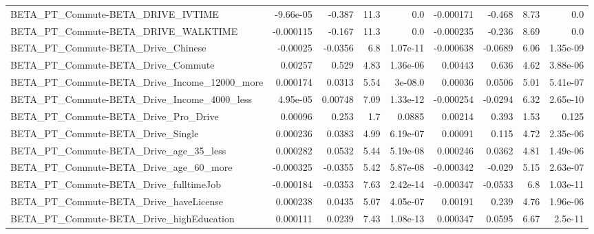 \begin{tabular}{lrrrrrrrr}
BETA\_PT\_Commute-BETA\_DRIVE\_IVTIME                  &   -9.66e-05 &       -0.387 &      11.3 &      0.0 &  -0.000171 &      -0.468 &         8.73 &           0.0 \\
BETA\_PT\_Commute-BETA\_DRIVE\_WALKTIME                &   -0.000115 &       -0.167 &      11.3 &      0.0 &  -0.000235 &      -0.236 &         8.69 &           0.0 \\
BETA\_PT\_Commute-BETA\_Drive\_Chinese                 &    -0.00025 &      -0.0356 &       6.8 & 1.07e-11 &  -0.000638 &     -0.0689 &         6.06 &      1.35e-09 \\
BETA\_PT\_Commute-BETA\_Drive\_Commute                 &     0.00257 &        0.529 &      4.83 & 1.36e-06 &    0.00443 &       0.636 &         4.62 &      3.88e-06 \\
BETA\_PT\_Commute-BETA\_Drive\_Income\_12000\_more       &    0.000174 &       0.0313 &      5.54 &  3e-08.0 &    0.00036 &      0.0506 &         5.01 &      5.41e-07 \\
BETA\_PT\_Commute-BETA\_Drive\_Income\_4000\_less        &    4.95e-05 &      0.00748 &      7.09 & 1.33e-12 &  -0.000254 &     -0.0294 &         6.32 &      2.65e-10 \\
BETA\_PT\_Commute-BETA\_Drive\_Pro\_Drive               &     0.00096 &        0.253 &       1.7 &   0.0885 &    0.00214 &       0.393 &         1.53 &         0.125 \\
BETA\_PT\_Commute-BETA\_Drive\_Single                  &    0.000236 &       0.0383 &      4.99 & 6.19e-07 &    0.00091 &       0.115 &         4.72 &      2.35e-06 \\
BETA\_PT\_Commute-BETA\_Drive\_age\_35\_less             &    0.000282 &       0.0532 &      5.44 & 5.19e-08 &   0.000246 &      0.0362 &         4.81 &      1.49e-06 \\
BETA\_PT\_Commute-BETA\_Drive\_age\_60\_more             &   -0.000325 &      -0.0355 &      5.42 & 5.87e-08 &  -0.000342 &      -0.029 &         5.15 &      2.63e-07 \\
BETA\_PT\_Commute-BETA\_Drive\_fulltimeJob             &   -0.000184 &      -0.0353 &      7.63 & 2.42e-14 &  -0.000347 &     -0.0533 &          6.8 &      1.03e-11 \\
BETA\_PT\_Commute-BETA\_Drive\_haveLicense             &    0.000238 &       0.0435 &      5.07 & 4.05e-07 &    0.00191 &       0.239 &         4.76 &      1.96e-06 \\
BETA\_PT\_Commute-BETA\_Drive\_highEducation           &    0.000111 &       0.0239 &      7.43 & 1.08e-13 &   0.000347 &      0.0595 &         6.67 &       2.5e-11 \\

\end{tabular}

